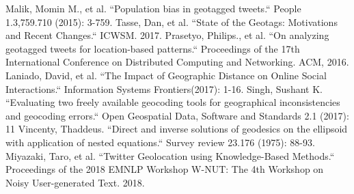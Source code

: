 \begin{thebibliography}{200}
Malik, Momin M., et al. ``Population bias in geotagged tweets.`` People 1.3,759.710 (2015): 3-759.\label{appendix:1.12}
Tasse, Dan, et al. ``State of the Geotags: Motivations and Recent Changes.`` ICWSM. 2017.\label{appendix:1.13}
Prasetyo, Philips., et al. ``On analyzing geotagged tweets for location-based patterns.`` Proceedings of the 17th International Conference on Distributed Computing and Networking. ACM, 2016.\label{appendix:1.14}
Laniado, David, et al. ``The Impact of Geographic Distance on Online Social Interactions.`` Information Systems Frontiers(2017): 1-16.\label{appendix:1.15}
Singh, Sushant K. ``Evaluating two freely available geocoding tools for geographical inconsistencies and geocoding errors.`` Open Geospatial Data, Software and Standards 2.1 (2017): 11\label{appendix:1.16}
Vincenty, Thaddeus. ``Direct and inverse solutions of geodesics on the ellipsoid with application of nested equations.`` Survey review 23.176 (1975): 88-93.\label{appendix:1.17}
Miyazaki, Taro, et al. ``Twitter Geolocation using Knowledge-Based Methods.`` Proceedings of the 2018 EMNLP Workshop W-NUT: The 4th Workshop on Noisy User-generated Text. 2018.\label{appendix:1.18}


\end{thebibliography}
